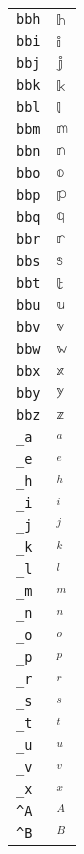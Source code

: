 \begin{longtable}{ll}
\texttt{bbh}&${}\mathbb{h}{}$\\
\texttt{bbi}&${}\mathbb{i}{}$\\
\texttt{bbj}&${}\mathbb{j}{}$\\
\texttt{bbk}&${}\mathbb{k}{}$\\
\texttt{bbl}&${}\mathbb{l}{}$\\
\texttt{bbm}&${}\mathbb{m}{}$\\
\texttt{bbn}&${}\mathbb{n}{}$\\
\texttt{bbo}&${}\mathbb{o}{}$\\
\texttt{bbp}&${}\mathbb{p}{}$\\
\texttt{bbq}&${}\mathbb{q}{}$\\
\texttt{bbr}&${}\mathbb{r}{}$\\
\texttt{bbs}&${}\mathbb{s}{}$\\
\texttt{bbt}&${}\mathbb{t}{}$\\
\texttt{bbu}&${}\mathbb{u}{}$\\
\texttt{bbv}&${}\mathbb{v}{}$\\
\texttt{bbw}&${}\mathbb{w}{}$\\
\texttt{bbx}&${}\mathbb{x}{}$\\
\texttt{bby}&${}\mathbb{y}{}$\\
\texttt{bbz}&${}\mathbb{z}{}$\\
\texttt{\_a}&${}_a{}$\\
\texttt{\_e}&${}_e{}$\\
\texttt{\_h}&${}_h{}$\\
\texttt{\_i}&${}_i{}$\\
\texttt{\_j}&${}_j{}$\\
\texttt{\_k}&${}_k{}$\\
\texttt{\_l}&${}_l{}$\\
\texttt{\_m}&${}_m{}$\\
\texttt{\_n}&${}_n{}$\\
\texttt{\_o}&${}_o{}$\\
\texttt{\_p}&${}_p{}$\\
\texttt{\_r}&${}_r{}$\\
\texttt{\_s}&${}_s{}$\\
\texttt{\_t}&${}_t{}$\\
\texttt{\_u}&${}_u{}$\\
\texttt{\_v}&${}_v{}$\\
\texttt{\_x}&${}_x{}$\\
\texttt{\textasciicircum A}&${}^A{}$\\
\texttt{\textasciicircum B}&${}^B{}$\\

\end{longtable}
